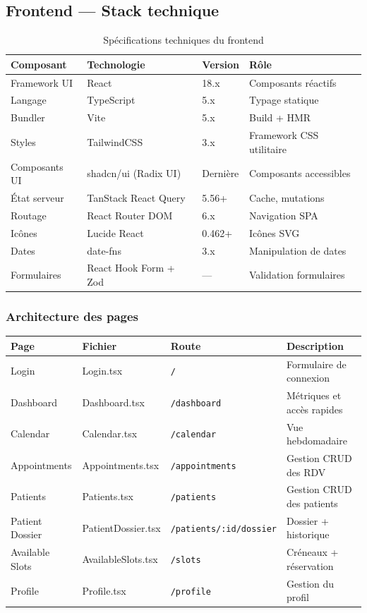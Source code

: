 \subsection{Frontend --- Stack technique}

\begin{table}[H]
\centering
\caption{Spécifications techniques du frontend}
\label{tab:stack_frontend}
\begin{tabular}{@{} l l l p{5cm} @{}}
\toprule
\textbf{Composant} & \textbf{Technologie} & \textbf{Version} & \textbf{Rôle} \\
\midrule
Framework UI & React & 18.x & Composants réactifs \\
Langage & TypeScript & 5.x & Typage statique \\
Bundler & Vite & 5.x & Build + HMR \\
Styles & TailwindCSS & 3.x & Framework CSS utilitaire \\
Composants UI & shadcn/ui (Radix UI) & Dernière & Composants accessibles \\
État serveur & TanStack React Query & 5.56+ & Cache, mutations \\
Routage & React Router DOM & 6.x & Navigation SPA \\
Icônes & Lucide React & 0.462+ & Icônes SVG \\
Dates & date-fns & 3.x & Manipulation de dates \\
Formulaires & React Hook Form + Zod & --- & Validation formulaires \\
\bottomrule
\end{tabular}
\end{table}

\subsubsection{Architecture des pages}

\begin{table}[H]
\centering
\begin{tabular}{@{} l l l p{5.5cm} @{}}
\toprule
\textbf{Page} & \textbf{Fichier} & \textbf{Route} & \textbf{Description} \\
\midrule
Login & Login.tsx & \texttt{/} & Formulaire de connexion \\
Dashboard & Dashboard.tsx & \texttt{/dashboard} & Métriques et accès rapides \\
Calendar & Calendar.tsx & \texttt{/calendar} & Vue hebdomadaire \\
Appointments & Appointments.tsx & \texttt{/appointments} & Gestion CRUD des RDV \\
Patients & Patients.tsx & \texttt{/patients} & Gestion CRUD des patients \\
Patient Dossier & PatientDossier.tsx & \texttt{/patients/:id/dossier} & Dossier + historique \\
Available Slots & AvailableSlots.tsx & \texttt{/slots} & Créneaux + réservation \\
Profile & Profile.tsx & \texttt{/profile} & Gestion du profil \\
\bottomrule
\end{tabular}
\end{table}

